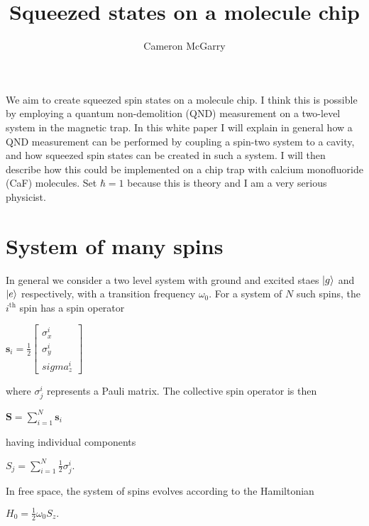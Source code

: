 \documentclass{article}
\title{Squeezed states on a molecule chip}
\author{Cameron McGarry}
\begin{document}
\maketitle

We aim to create squeezed spin states on a molecule chip. I think this is
possible by employing a quantum non-demolition (QND) measurement on a two-level
system in the magnetic trap. In this white paper I will explain in general how
a QND measurement can be performed by coupling a spin-two system to a cavity,
and how squeezed spin states can be created in such a system. I will then
describe how this could be implemented on a chip trap with calcium monofluoride
(CaF) molecules. Set $\hbar=1$ because this is theory and I am a very serious
physicist.

\section{System of many spins}

In general we consider a two level system with ground and excited staes $\ket{g}$
and $\ket{e}$ respectively, with a transition frequency $\omega_0$. For a
system of $N$ such spins, the $i^\text{th}$ spin has a spin operator

\begin{math}
\mathbf{s}_i = \frac{1}{2}\begin{bmatrix} \sigma^i_x \\ \sigma^i_y \\sigma^i_z
\end{bmatrix}
\end{math}

where $\sigma^i_j$ represents a Pauli matrix. The collective spin operator is
then

\begin{math}
\mathbf{S} = \sum_{i=1}^N \mathbf{s}_i
\end{math}

having individual components

\begin{math}
S_j = \sum_{i=1}^N \frac{1}{2} \sigma_j^i.
\end{math}

In free space, the system of spins evolves according to the Hamiltonian

\begin{math}
H_0 = \frac{1}{2}\omega_0 S_z.
\end{math}
\end{document}
